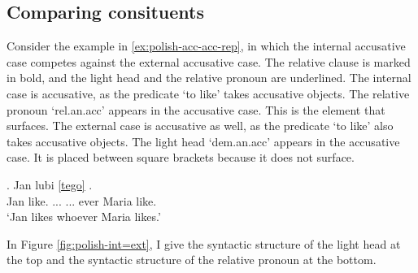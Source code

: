 \subsection{Comparing consituents}

Consider the example in \ref{ex:polish-acc-acc-rep}, in which the internal accusative case competes against the external accusative case. The relative clause is marked in bold, and the light head and the relative pronoun are underlined.
The internal case is accusative, as the predicate  `to like' takes accusative objects. The relative pronoun  `\ac{rel}.\ac{an}.\ac{acc}' appears in the accusative case. This is the element that surfaces.
The external case is accusative as well, as the predicate  `to like' also takes accusative objects. The light head  `\ac{dem}.\ac{an}.\ac{acc}' appears in the accusative case. It is placed between square brackets because it does not surface.

\exg. Jan lubi \underline{[tego]} \underline{}   .\\
 Jan like.\scsub{[acc]} ...  ... ever Maria like.\scsub{[acc]}\\
 `Jan likes whoever Maria likes.' \label{ex:polish-acc-acc-rep}

In Figure \ref{fig:polish-int=ext}, I give the syntactic structure of the light head at the top and the syntactic structure of the relative pronoun at the bottom.

